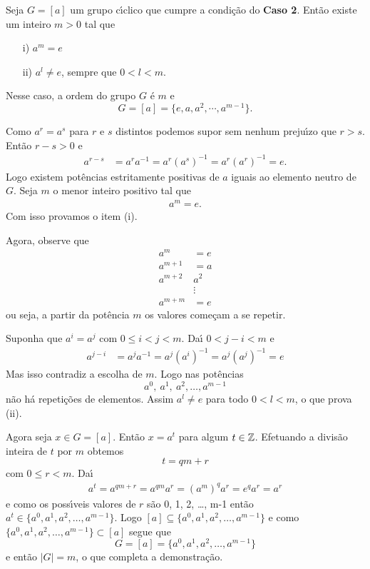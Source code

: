 \begin{proposicao}
    Seja $G = [a]$ um grupo c{\'\i}clico que cumpre a condi\c{c}\~ao do \textbf{Caso 2}. Ent\~ao existe um inteiro $m > 0$ tal que
    \begin{enumerate}
        \item[i)] $a^m = e$

        \item[ii)] $a^l \ne e$, sempre que $0 < l < m$.
    \end{enumerate}
    Nesse caso, a ordem do grupo $G$ \'e $m$ e
    \[
        G = [a] = \{e, a, a^2, \cdots, a^{m - 1}\}.
    \]
\end{proposicao}
\begin{prova}
    Como $a^r = a^s$ para $r$ e $s$ distintos podemos supor sem nenhum preju{\'\i}zo que $r > s$. Ent\~ao $r - s > 0$ e
    \begin{align*}
        a^{r - s} &= a^ra^{-1} = a^r(a^s)^{-1} = a^r(a^r)^{-1} = e.
    \end{align*}
    Logo existem pot\^encias estritamente positivas de $a$ iguais ao elemento neutro de $G$. Seja $m$ o menor inteiro positivo tal que
    \begin{align}\label{ordem_elemento_ciclico}
        a^m = e.
    \end{align}
    Com isso provamos o item (i).

    Agora, observe que
    \begin{align*}
        a^m &= e\\
        a^{m + 1} &= a\\
        a^{m + 2} & a^2\\
        &\vdots\\
        a^{m + m} &= e
    \end{align*}
    ou seja, a partir da pot\^encia $m$ os valores come\c{c}am a se repetir.

    Suponha que $a^i = a^j$ com $0 \le i < j < m$. Da{\'\i} $0 < j - i < m$ e
    \begin{align*}
        a^{j -  i} &= a^ja^{-1} = a^j(a^i)^{-1} = a^j(a^j)^{-1} = e
    \end{align*}
    Mas isso contradiz a escolha de $m$. Logo nas pot\^encias
    \[
        a^0,\ a^1,\ a^2, \dots, a^{m - 1}
    \]
    n\~ao h\'a repeti\c{c}\~oes de elementos. Assim $a^l \ne e$ para todo $0 < l < m$, o que prova (ii).

    Agora seja $x \in G = [a]$. Ent\~ao $x = a^t$ para algum $t \in \mathbb{Z}$. Efetuando a divis\~ao inteira de $t$ por $m$ obtemos
    \[
        t = qm + r
    \]
    com $0 \le r < m$. Da{\'\i}
    \begin{align*}
        a^t = a^{qm + r} = a^{qm}a^r = (a^m)^qa^r = e^qa^r = a^r
    \end{align*}
    e como os poss{\'\i}veis valores de $r$ s\~ao 0, 1, 2, \dots, m-1 ent\~ao $a^t \in \{a^0, a^1, a^2, \dots, a^{m - 1}\}$. Logo $[a] \subseteq \{a^0, a^1, a^2, \dots, a^{m - 1}\}$ e como $\{a^0, a^1, a^2, \dots, a^{m - 1}\} \subset [a]$ segue que
    \[
        G = [a] = \{a^0, a^1, a^2, \dots, a^{m - 1}\}
    \]
    e ent\~ao $|G| = m$, o que completa a demonstra\c{c}\~ao.
\end{prova}

